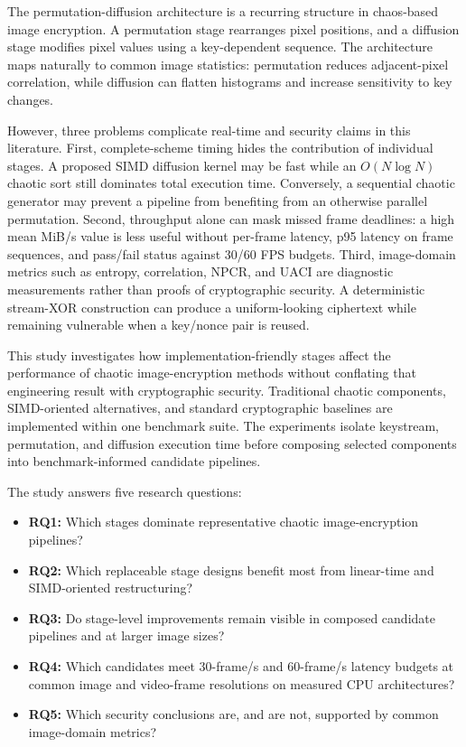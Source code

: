 \documentclass[twocolumn,runningheads]{svjour3}
\begin{document}
The permutation-diffusion architecture is a recurring structure in
chaos-based image encryption. A permutation stage rearranges pixel positions,
and a diffusion stage modifies pixel values using a key-dependent sequence.
The architecture maps naturally to common image statistics: permutation
reduces adjacent-pixel correlation, while diffusion can flatten histograms and
increase sensitivity to key changes.

However, three problems complicate real-time and security claims in this
literature. First, complete-scheme timing hides the contribution of individual
stages. A proposed SIMD diffusion kernel may be fast while an
$O(N\log N)$ chaotic sort still dominates total execution time. Conversely, a
sequential chaotic generator may prevent a pipeline from benefiting from an
otherwise parallel permutation. Second, throughput alone can mask missed
frame deadlines: a high mean MiB/s value is less useful without per-frame
latency, p95 latency on frame sequences, and pass/fail status against 30/60
FPS budgets. Third, image-domain metrics such as entropy, correlation, NPCR,
and UACI are diagnostic measurements rather than proofs of cryptographic
security. A deterministic stream-XOR construction can produce a uniform-looking
ciphertext while remaining vulnerable when a key/nonce pair is reused.

This study investigates how implementation-friendly stages affect the
performance of chaotic image-encryption methods without conflating that
engineering result with cryptographic security. Traditional chaotic
components, SIMD-oriented alternatives, and standard cryptographic baselines
are implemented within one benchmark suite. The experiments isolate keystream,
permutation, and diffusion execution time before composing selected components
into benchmark-informed candidate pipelines.

The study answers five research questions:
\begin{itemize}
\item \textbf{RQ1:} Which stages dominate representative chaotic
image-encryption pipelines?
\item \textbf{RQ2:} Which replaceable stage designs benefit most from
linear-time and SIMD-oriented restructuring?
\item \textbf{RQ3:} Do stage-level improvements remain visible in composed
candidate pipelines and at larger image sizes?
\item \textbf{RQ4:} Which candidates meet 30-frame/s and 60-frame/s latency
budgets at common image and video-frame resolutions on measured CPU
architectures?
\item \textbf{RQ5:} Which security conclusions are, and are not, supported by
common image-domain metrics?
\end{itemize}
\end{document}
